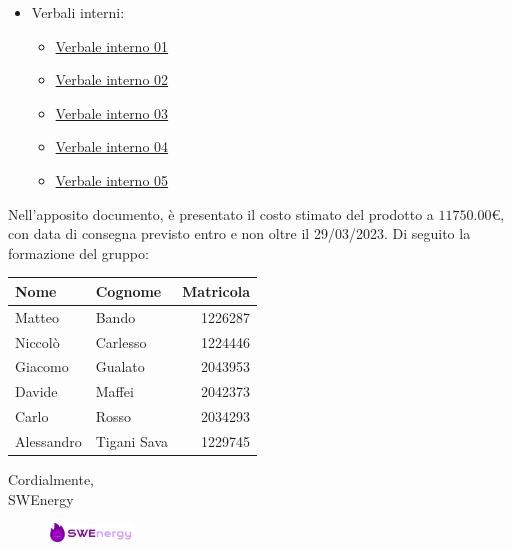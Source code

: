 \begin{itemize}
	\item Verbali interni:
		\begin{itemize}
			\item
				\href{https://github.com/Project-SWEnergy/documentazione/blob/main/Candidatura/Verbale\%20interno\%20-\%2001.pdf}{Verbale interno 01}
			\item
				\href{https://github.com/Project-SWEnergy/documentazione/blob/main/Candidatura/Verbale\%20interno\%20-\%2002.pdf}{Verbale interno 02}
			\item
				\href{https://github.com/Project-SWEnergy/documentazione/blob/main/Candidatura/Verbale\%20interno\%20-\%2003.pdf}{Verbale interno 03}
			\item
				\href{https://github.com/Project-SWEnergy/documentazione/blob/main/Candidatura/Verbale\%20interno\%20-\%2004.pdf}{Verbale interno 04}
			\item
				\href{https://github.com/Project-SWEnergy/documentazione/blob/main/Candidatura/Verbale\%20interno\%20-\%2005.pdf}{Verbale interno 05}
		\end{itemize}
\end{itemize}


Nell’apposito documento, è presentato il costo stimato del prodotto a 
$11750.00$€, 
con data di consegna previsto entro e non oltre il 29/03/2023. Di seguito la
formazione del gruppo:

\begin{center}
{
\renewcommand{\arraystretch}{1.5}
\begin{tabular}{llr}
	\textbf{Nome} & \textbf{Cognome}	& \textbf{Matricola}		\\
	\toprule
	Matteo		&	Bando				&	1226287					\\
	Niccolò 	&	Carlesso		 	& 	1224446					\\
	Giacomo 	&	Gualato			 	& 	2043953					\\
	Davide		&	Maffei			 	& 	2042373					\\
	Carlo		&	Rosso			 	&	2034293					\\
	Alessandro	&	Tigani Sava		 	&	1229745					\\
	\bottomrule
\end{tabular}
}
\end{center}

\vspace{1cm}

\noindent
Cordialmente, \\
SWEnergy

\begin{figure}[H]
	\includegraphics[width=0.2\textwidth]{img/sign.png}
\end{figure}
